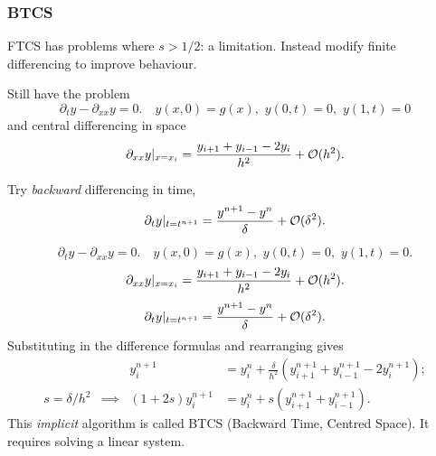 \documentclass{beamer}
\begin{document}
\begin{frame}
  \frametitle{BTCS}

  \begin{overlayarea}{\textwidth}{0.8\textheight}
    {
      FTCS has problems where $s
      > 1/2$:  a limitation. Instead modify
      finite differencing to improve  behaviour.
    }
    {

      \vspace{1ex}

      Still have the problem
      \begin{equation*}
        \partial_{t} y - \partial_{x x} y = 0. \quad y(x, 0) = g(x),
        \,\, y(0, t) = 0, \,\, y(1, t) = 0
      \end{equation*}
      and central differencing in space
      \begin{equation*}
        \partial_{x x} y |_{x = x_i} = \frac{ y_{i+1} + y_{i-1} - 2
          y_i}{h^2} + {\cal O}(h^2).
      \end{equation*}
    }
    {

      Try \emph{backward} differencing in time,
      \begin{equation*}
        \partial_t y |_{t = t^{n+1}} = \frac{y^{n+1} - y^n}{\delta} + {\cal
          O}(\delta^2).
      \end{equation*}
    }
    {
      \begin{equation*}
        \partial_{t} y - \partial_{x x} y = 0. \quad y(x, 0) = g(x),
        \,\, y(0, t) = 0, \,\, y(1, t) = 0.
      \end{equation*}
      \begin{equation*}
        \partial_{x x} y |_{x = x_i} = \frac{ y_{i+1} + y_{i-1} - 2
          y_i}{h^2} + {\cal O}(h^2).
      \end{equation*}
      \begin{equation*}
        \partial_t y |_{t = t^{n+1}} = \frac{y^{n+1} - y^n}{\delta} + {\cal
          O}(\delta^2).
      \end{equation*}
      Substituting in the difference formulas and rearranging gives
      \begin{align*}
        && y_i^{n+1} & = y_i^n + \frac{\delta}{h^2} \left( y_{i+1}^{n+1} +
          y_{i-1}^{n+1} - 2 y_i^{n+1} \right); \\
        s = \delta / h^2 & \implies & (1 + 2 s) y_i^{n+1} & = y_i^n +
        s \left( y_{i+1}^{n+1} + y_{i-1}^{n+1} \right).
      \end{align*}
    }
    {
      This \emph{implicit} algorithm is called BTCS (Backward Time,
      Centred Space). It requires solving a linear system.
    }
  \end{overlayarea}


\end{frame}
\end{document}
